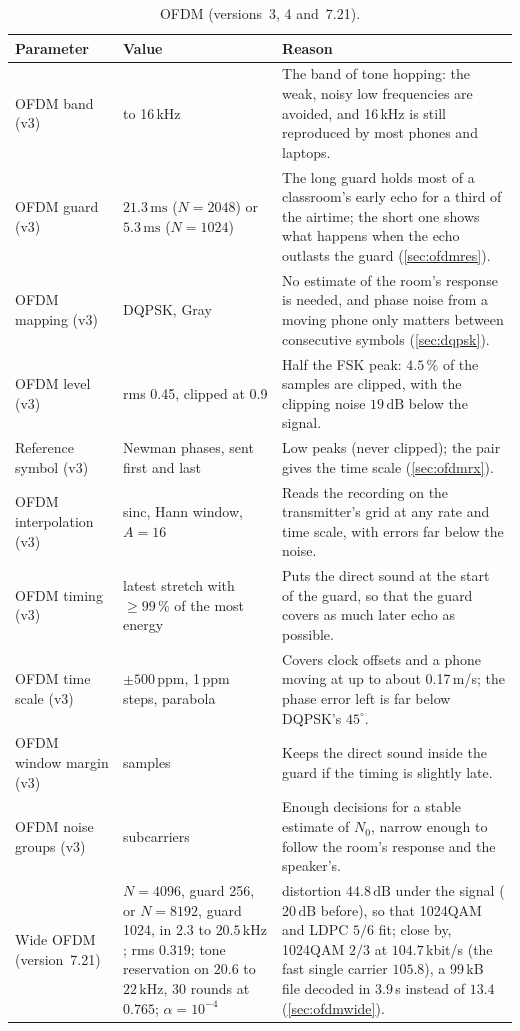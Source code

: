 \documentclass[11pt,a4paper]{article}
\newcommand{\kHz}{\,\mathrm{kHz}}
\newcommand{\ms}{\,\mathrm{ms}}
\newcommand{\dB}{\,\mathrm{dB}}
\theoremstyle{remark}
\begin{document}
\begin{table}[ht]
\centering
\caption{OFDM (versions~3, 4 and~7.21).}
\label{tab:pofdm}
\small
\begin{tabularx}{\linewidth}{>{\raggedright\arraybackslash}p{3.4cm}>{\raggedright\arraybackslash}p{3.1cm}X}
\toprule
Parameter & Value & Reason\\
\midrule
OFDM band (v3) & 3.2 to 16\,kHz & The band of tone hopping: the weak, noisy low frequencies are avoided, and 16\,kHz is still reproduced by most phones and laptops.\\
OFDM guard (v3) & $21.3\ms$ ($N = 2048$) or $5.3\ms$ ($N = 1024$) & The long guard holds most of a classroom's early echo for a third of the airtime; the short one shows what happens when the echo outlasts the guard (\cref{sec:ofdmres}).\\
OFDM mapping (v3) & DQPSK, Gray & No estimate of the room's response is needed, and phase noise from a moving phone only matters between consecutive symbols (\cref{sec:dqpsk}).\\
OFDM level (v3) & rms 0.45, clipped at 0.9 & Half the FSK peak: $4.5\,\%$ of the samples are clipped, with the clipping noise $19\dB$ below the signal.\\
Reference symbol (v3) & Newman phases, sent first and last & Low peaks (never clipped); the pair gives the time scale (\cref{sec:ofdmrx}).\\
OFDM interpolation (v3) & sinc, Hann window, $A = 16$ & Reads the recording on the transmitter's grid at any rate and time scale, with errors far below the noise.\\
OFDM timing (v3) & latest stretch with $\ge 99\,\%$ of the most energy & Puts the direct sound at the start of the guard, so that the guard covers as much later echo as possible.\\
OFDM time scale (v3) & $\pm 500$\,ppm, 1\,ppm steps, parabola & Covers clock offsets and a phone moving at up to about 0.17\,m/s; the phase error left is far below DQPSK's $45^\circ$.\\
OFDM window margin (v3) & 8 samples & Keeps the direct sound inside the guard if the timing is slightly late.\\
OFDM noise groups (v3) & 32 subcarriers & Enough decisions for a stable estimate of $N_0$, narrow enough to follow the room's response and the speaker's.\\
Wide OFDM (version~7.21) & $N = 4096$, guard 256, or $N = 8192$, guard 1024, in $2.3$ to $20.5\kHz$; rms $0.319$; tone reservation on $20.6$ to $22\kHz$, 30 rounds at $0.765$; $\alpha = 10^{-4}$ & distortion $44.8\dB$ under the signal ($20\dB$ before), so that 1024QAM and LDPC $5/6$ fit; close by, 1024QAM $2/3$ at $104.7$\,kbit/s (the fast single carrier $105.8$), a 99\,kB file decoded in $3.9$\,s instead of $13.4$ (\cref{sec:ofdmwide}).\\

\end{tabularx}
\end{table}
\end{document}
